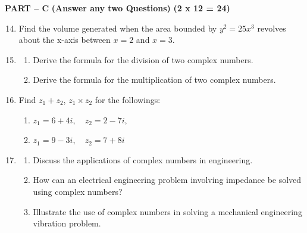 \documentclass[11pt,a4paper]{article}
\begin{document}
\vspace{0.3cm}
\noindent
\textbf{PART -- C} \hfill \textbf{(Answer any two Questions)} \hfill \textbf{(2 x 12 = 24)}

\begin{enumerate}
    \setcounter{enumi}{13}
    \itemsep0em
    \item Find the volume generated when the area bounded by $y^2 = 25x^3$ revolves about the x-axis between $x=2$ and $x=3$.
    \item 
    \begin{enumerate}
        \item[(i)] Derive the formula for the division of two complex numbers.
        \item[(ii)] Derive the formula for the multiplication of two complex numbers.
    \end{enumerate}
    \item Find $z_1 + z_2$, $z_1 \times z_2$ for the followings:
    \begin{enumerate}
        \item[(i)] $z_1 = 6 + 4i, \quad z_2 = 2 - 7i,$
        \item[(ii)] $z_1 = 9 - 3i, \quad z_2 = 7 + 8i$
    \end{enumerate}
    \item 
    \begin{enumerate}
        \item[(i)] Discuss the applications of complex numbers in engineering.
        \item[(ii)] How can an electrical engineering problem involving impedance be solved using complex numbers?
        \item[(iii)] Illustrate the use of complex numbers in solving a mechanical engineering vibration problem.
    \end{enumerate}
\end{enumerate}
\end{document}
